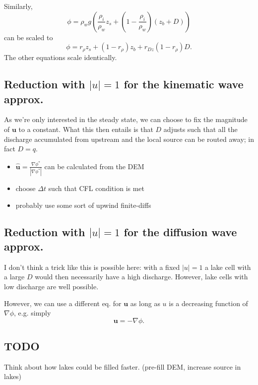 \documentclass[DIV=13,halfparskip,11pt,headinclude]{scrartcl}
\begin{document}
Similarly,
\begin{equation}
\phi = \rho_w g \left( \frac{\rho_i}{\rho_w}z_s + \left(1- \frac{\rho_i}{\rho_w}\right)(
  z_b + D)\right)
\end{equation}
can be scaled to
\begin{equation}
\phi = r_\rho z_s + (1- r_\rho)z_b + r_{Dz}(1- r_\rho)D.
\end{equation}
The other equations scale identically.

\subsection{Reduction with \(|u|=1\) for the kinematic wave approx.}
\label{sec:orgbae1021}

As we're only interested in the steady state, we can choose to fix the
magnitude of \(\mathbf{u}\) to a constant.  What this then entails is
that \(D\) adjusts such that all the discharge accumulated from upstream
and the local source can be routed away; in fact \(D=q\).

\begin{itemize}
\item \(\mathbf{\hat u} = \frac{\nabla \phi^*}{|\nabla \phi^*|}\) can be
calculated from the DEM
\item choose \(\Delta t\) such that CFL condition is met
\item probably use some sort of upwind finite-diffs
\end{itemize}

\subsection{Reduction with \(|u|=1\) for the diffusion wave approx.}
\label{sec:org7f4e9a4}

I don't think a trick like this is possible here: with a fixed \(|u|=1\)
a lake cell with a large \(D\) would then necessarily have a high
discharge.  However, lake cells with low discharge are well possible.

However, we can use a different eq. for \(\mathbf{u}\) as long as \(u\) is
a decreasing function of \(\nabla \phi\), e.g. simply
\begin{equation}
\mathbf{u} = - \nabla \phi.
\end{equation}

\subsection{TODO}
Think about how lakes could be filled faster.  (pre-fill DEM, increase
source in lakes)
\end{document}

